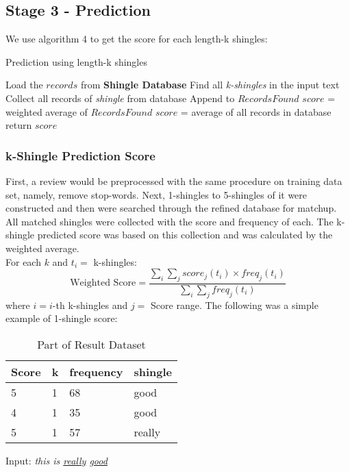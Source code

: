 \subsection{Stage 3 - Prediction}
We use algorithm 4 to get the score for each length-k shingles:
\begin{algorithm}
	\caption{Prediction using length-k shingles}
	\DontPrintSemicolon
	Load the \(records\) from \textbf{Shingle Database}\;
	Find all \textit{k-shingles} in the input text\;
	{
		Collect all records of \textit{shingle} from database\;
		Append to \(RecordsFound\)\;
	}
	{
		\(score\) = weighted average of \(RecordsFound\)\;
	}
	{
		\(score\) = average of all records in database\;
	}
	return \(score\)\;
\end{algorithm}

\subsubsection{k-Shingle Prediction Score}
First, a review would be preprocessed with the same procedure on training data set, namely, remove stop-words. Next, 1-shingles to 5-shingles of it were constructed and then were searched through the refined database for matchup.
All matched shingles were collected with the score and frequency of each.
The k-shingle predicted score was based on this collection and was calculated by the weighted average.\\
For each \(k\) and \(t_i =\) k-shingles:
\begin{displaymath}
\mbox{Weighted Score} = \frac{\sum_i\sum_j score_j(t_i) \times freq_j(t_i)}{\sum_i\sum_j freq_j(t_i)}
\end{displaymath}
where \(i= i\)-th k-shingles and \(j=\) Score range.
The following was a simple example of 1-shingle score:

\begin{table}[H]
	\caption{Part of Result Dataset}
	\label{tab:commands}
	\begin{tabular}{llll}
	\toprule
	Score & k & frequency & shingle \\
	\midrule
	5 & 1 & 68 & good \\
	4 & 1 & 35 & good \\
	5 & 1 & 57 & really \\
	\bottomrule
	\end{tabular}
\end{table}

Input: \textit{this is \underline{really} \underline{good}}

